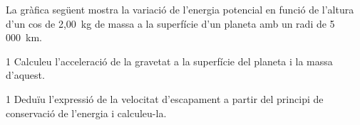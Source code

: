 La gràfica següent mostra la variació de l'energia potencial en funció de l'altura d'un cos de 2,00~kg de massa a la superfície d'un planeta amb un radi de 5\,000~km.


\begin{apartat}{1}
Calculeu l'acceleració de la gravetat a la superfície del planeta i la massa d'aquest.
\end{apartat}

\begin{apartat}{1}
Deduïu l'expressió de la velocitat d'escapament a partir del principi de conservació de l'energia i calculeu-la.
\end{apartat}

